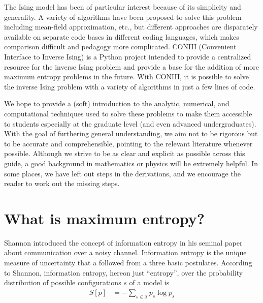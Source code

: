 \documentclass[aps,prl,twocolumn]{revtex4-1}
\begin{document}
The Ising model has been of particular interest because of its simplicity and generality. A variety of algorithms have been proposed to solve this problem including mean-field approximation, etc., but different approaches are disparately available on separate code bases in different coding languages, which makes comparison difficult and pedagogy more complicated.
CONIII (Convenient Interface to Inverse Ising) is a Python project intended to provide a centralized resource for the inverse Ising problem and provide a base for the addition of more maximum entropy problems in the future. With CONIII, it is possible to solve the inverse Ising problem with a variety of algorithms in just a few lines of code.


We hope to provide a (soft) introduction to the analytic, numerical, and computational techniques used to solve these problems to make them accessible to students especially at the graduate level (and even advanced undergraduates). With the goal of furthering general understanding, we aim not to be rigorous but to be accurate and comprehensible, pointing to the relevant literature whenever possible. Although we strive to be as clear and explicit as possible across this guide, a good background in mathematics or physics will be extremely helpful. In some places, we have left out steps in the derivations, and we encourage the reader to work out the missing steps.

\section{What is maximum entropy?}
Shannon introduced the concept of information entropy in his seminal paper about communication over a noisy channel. Information entropy is the unique measure of uncertainty that a followed from a three basic postulates. According to Shannon, information entropy, hereon just ``entropy'', over the probability distribution of possible configurations $s$ of a model is
\begin{align}
	S[p] &= -\sum_{s\in \mathcal{S}} p_s \log p_s
\end{align}
\end{document}
